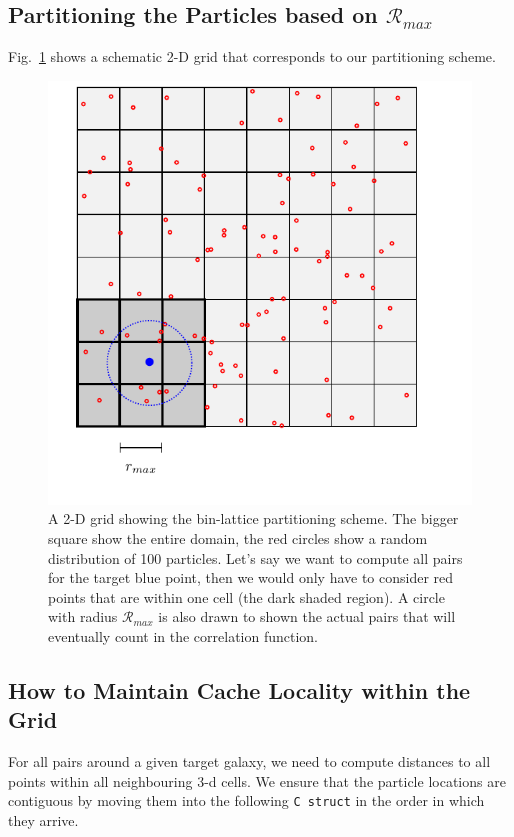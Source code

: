 \documentclass[preprint, 12pt, authoryear]{elsarticle}
\newcommand{\rmax}{\ensuremath{{{\mathcal{R}}_{max}}}\xspace}
\begin{document}
\subsection{Partitioning the Particles based on \rmax}
Fig.~\ref{fig:grid} shows a schematic 2-D grid that corresponds to our partitioning scheme.
\begin{figure}[htbp]
\centering
\includegraphics[clip=true]{tikz_grid}
\caption{A 2-D grid showing the bin-lattice partitioning scheme. The bigger square show the entire 
domain, the red circles show a random distribution of 100 particles. Let's say we want to compute all pairs 
for the target blue point, then we would only have to consider red points that are within one cell (the dark shaded region). 
A circle with radius \rmax is also drawn to shown the actual pairs that will eventually count in the correlation function.} 
\label{fig:grid}
\end{figure}


\subsection{How to Maintain Cache Locality within the Grid}
For all pairs around a given target galaxy, we need to compute distances to all points within all neighbouring 3-d cells. 
We ensure that the particle locations are contiguous by moving them into the following \texttt{C struct} in the order in which they arrive. 
\end{document}

